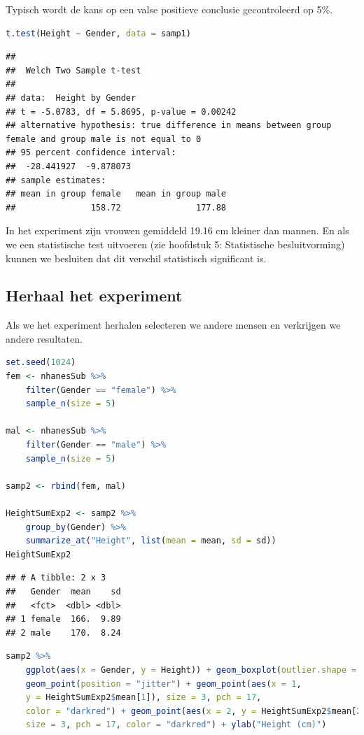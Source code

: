 \documentclass[
  12pt,dutch,coursenotes]{book}
\theoremstyle{definition}
\theoremstyle{definition}
\theoremstyle{definition}
\theoremstyle{definition}
\theoremstyle{remark}
\begin{document}
Typisch wordt de kans op een valse positieve conclusie gecontroleerd op 5\%.

\begin{lstlisting}[language=R]
t.test(Height ~ Gender, data = samp1)
\end{lstlisting}

\begin{lstlisting}
## 
##  Welch Two Sample t-test
## 
## data:  Height by Gender
## t = -5.0783, df = 5.8695, p-value = 0.00242
## alternative hypothesis: true difference in means between group female and group male is not equal to 0
## 95 percent confidence interval:
##  -28.441927  -9.878073
## sample estimates:
## mean in group female   mean in group male 
##               158.72               177.88
\end{lstlisting}

In het experiment zijn vrouwen gemiddeld 19.16 cm kleiner dan mannen. En als we een statistische test uitvoeren (zie hoofdstuk 5: Statistische besluitvorming) kunnen we besluiten dat dit verschil statistisch significant is.

\hypertarget{herhaal-het-experiment}{%
\subsection{Herhaal het experiment}\label{herhaal-het-experiment}}

Als we het experiment herhalen selecteren we andere mensen en verkrijgen we andere resultaten.

\begin{lstlisting}[language=R]
set.seed(1024)
fem <- nhanesSub %>%
    filter(Gender == "female") %>%
    sample_n(size = 5)

mal <- nhanesSub %>%
    filter(Gender == "male") %>%
    sample_n(size = 5)

samp2 <- rbind(fem, mal)

HeightSumExp2 <- samp2 %>%
    group_by(Gender) %>%
    summarize_at("Height", list(mean = mean, sd = sd))
HeightSumExp2
\end{lstlisting}

\begin{lstlisting}
## # A tibble: 2 x 3
##   Gender  mean    sd
##   <fct>  <dbl> <dbl>
## 1 female  166.  9.89
## 2 male    170.  8.24
\end{lstlisting}

\begin{lstlisting}[language=R]
samp2 %>%
    ggplot(aes(x = Gender, y = Height)) + geom_boxplot(outlier.shape = NA) +
    geom_point(position = "jitter") + geom_point(aes(x = 1,
    y = HeightSumExp2$mean[1]), size = 3, pch = 17,
    color = "darkred") + geom_point(aes(x = 2, y = HeightSumExp2$mean[2]),
    size = 3, pch = 17, color = "darkred") + ylab("Height (cm)")
\end{lstlisting}
\end{document}
